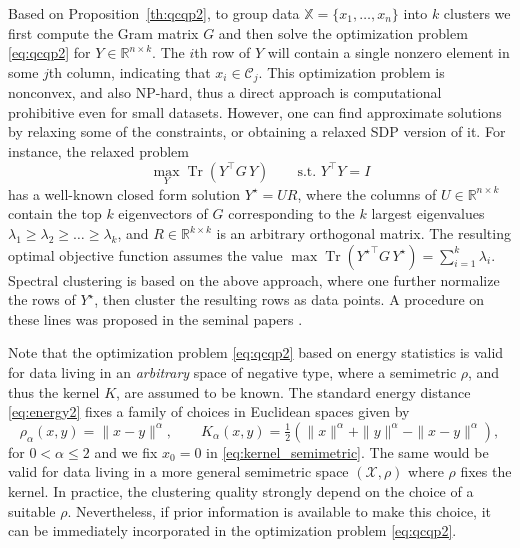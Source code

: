 \documentclass[aps,preprint,nofootinbib,floatfix]{revtex4-1}
\DeclareMathOperator{\Tr}{Tr}
\newcommand\kk{K}
\newcommand\C{{\mathcal{C}}}
\newcommand\Zt{Y}
\begin{document}
Based on Proposition~\ref{th:qcqp2}, to group data
$\mathbb{X} = \{ x_1,\dotsc,x_n \}$
into  $k$ clusters we first compute the Gram matrix
$G$ and then 
solve the optimization problem \eqref{eq:qcqp2} for $\Zt \in
\mathbb{R}^{n\times k}$. The $i$th row
of $\Zt$ will contain a single nonzero element in some $j$th column,
indicating that $x_i \in \C_j$. 
This optimization problem is nonconvex, and also NP-hard,
thus a direct approach 
is computational prohibitive even for small datasets.
However, one can find approximate solutions by relaxing some 
of the constraints, or obtaining a relaxed SDP version of it.
For instance, the relaxed problem
\begin{equation}
\label{eq:relaxed}
\max_{Y} \Tr \left( Y^\top G \, Y \right) \qquad \mbox{s.t. $Y^\top Y = I$}
\end{equation}
has a well-known closed form solution $Y^\star = U R$, where the
columns of $U \in \mathbb{R}^{n\times k}$ 
contain the top $k$ eigenvectors of $G$ corresponding
to the $k$ largest eigenvalues $\lambda_1\ge \lambda_2\ge\dotsc\ge\lambda_k$, 
and
$R \in \mathbb{R}^{k\times k}$ is an arbitrary orthogonal matrix. 
The resulting
optimal objective function assumes the value 
$\max \Tr \left( {Y^\star}^\top G \, Y^\star \right)  = 
\sum_{i=1}^k \lambda_i$. 
Spectral clustering is based on the above approach, where
one further normalize the rows of $Y^\star$, then cluster
the resulting rows as data points.
A procedure on these lines was proposed in the seminal papers
\cite{Malik,NgJordan}.

Note that the optimization problem \eqref{eq:qcqp2} based on energy
statistics
is valid for data living in an \emph{arbitrary} space of negative type, where
a semimetric $\rho$, and thus the kernel $\kk$, are
assumed to be known. The standard energy distance \eqref{eq:energy2}
fixes a family of choices in Euclidean spaces given by
\begin{equation}
\rho_\alpha(x,y) = \| x - y\|^\alpha, \qquad 
K_\alpha(x,y) = \tfrac{1}{2} \left( \| x \|^\alpha + \| y \|^\alpha - 
\| x-y\|^\alpha \right) ,
\end{equation}
for $0<\alpha\le 2$ and 
we fix $x_0=0$ in \eqref{eq:kernel_semimetric}.
The same would be valid for data living in a more general
semimetric space $(\mathcal{X}, \rho)$ where $\rho$ 
fixes the kernel.
In practice, the clustering quality strongly depend on the choice 
of a suitable $\rho$. 
Nevertheless, if prior information is available to make this choice, it
can be immediately incorporated in the 
optimization problem \eqref{eq:qcqp2}.
\end{document}
